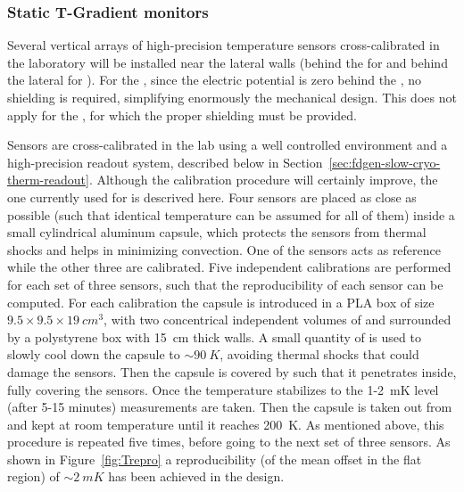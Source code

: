 
\subsubsection{Static T-Gradient monitors}
\label{sp-cisc-thermom-static-t}

Several vertical arrays of high-precision temperature sensors cross-calibrated in the laboratory will be installed near the lateral walls
(behind the  for \single and behind the lateral %
 for \dual). 
For the , since the electric potential is zero behind the , no \efield shielding is required, simplifying enormously the mechanical design.
This does not apply for the , for which the proper shielding must be provided. 


Sensors are cross-calibrated in the lab using a well controlled environment and a high-precision readout system, described below in Section~\ref{sec:fdgen-slow-cryo-therm-readout}. %
Although the calibration procedure will certainly improve, the one currently used for  is descrived here.
Four sensors are placed as close as possible (such that identical temperature can be assumed for all of them) inside a small cylindrical aluminum capsule,
which protects the sensors from thermal shocks and helps in minimizing convection.
One of the sensors acts as reference while the other three are %
calibrated. Five independent calibrations
are performed for each set of three sensors, such that the reproducibility of each sensor can be computed. For each calibration 
the capsule is introduced in a PLA box of size \(9.5\times9.5\times\SI{19}{cm^3}\), with two concentrical independent volumes of \lar
and surrounded by a polystyrene box with \SI{15}{cm} thick walls. A small quantity of \lar is used to slowly
cool down the capsule to $\sim\SI{90}{K}$, avoiding thermal shocks that could damage the sensors.
Then the capsule is covered by
  \lar such that it penetrates
inside, fully covering the sensors. Once the temperature stabilizes to the 1-\SI{2}{mK} level (after 5-15 minutes) measurements are taken. Then the capsule is taken out from \lar
and kept at room temperature until it reaches \SI{200}{K}. As mentioned above, this procedure is repeated five times, before going to the next set of three sensors.  
As shown in Figure~\ref{fig:Trepro} a reproducibility (\rms of the mean offset in the flat region) of $\sim \SI{2}{mK}$ has been achieved in the  design.  

